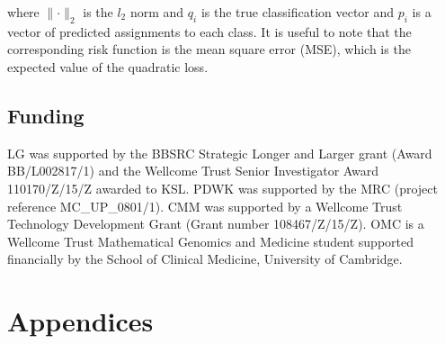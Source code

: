 \documentclass[12pt,english]{article}
\begin{document}
where $\lVert\cdot\rVert_2$ is the $l_2$ norm and $q_i$ is the
true classification vector and $p_i$ is a vector of predicted
assignments to each class. It is useful to note that
the corresponding risk function is the mean square error (MSE), which
is the expected value of the quadratic loss.

\subsection*{Funding}

LG was supported by the BBSRC Strategic Longer and Larger grant (Award
BB/L002817/1) and the Wellcome Trust Senior Investigator Award
110170/Z/15/Z awarded to KSL. PDWK was supported by the MRC (project
reference MC\_UP\_0801/1). CMM was supported by a Wellcome Trust
Technology Development Grant (Grant number 108467/Z/15/Z). OMC is a
Wellcome Trust Mathematical Genomics and Medicine student supported
financially by the School of Clinical Medicine, University of Cambridge.

\clearpage
\section{Appendices}
\end{document}
